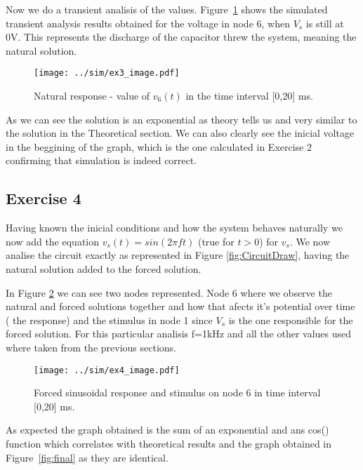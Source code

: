 Now we do a transient analisis of the values. Figure~\ref{fig:Ex3_Image} shows the simulated transient analysis results obtained for the voltage in node 6, when $V_s$ is still at 0V. This represents the discharge of the capacitor threw the system, meaning the natural solution.
\vspace{-32mm}

\begin{figure}[H]
  \centering
  \small
  \texttt{[image: ../sim/ex3\_image.pdf]}
  \caption{Natural response - value of $v_6(t)$ in the time interval [0,20] ms.}
  \label{fig:Ex3_Image}
\end{figure}

As we can see the solution is an exponential as theory tells us and very similar to the solution in the Theoretical section. We can also clearly see the inicial voltage in the beggining of the graph, which is the one calculated in Exercise 2 confirming that simulation is indeed correct.


\subsection{Exercise 4} \label{sec:Ex4Sim}
Having known the inicial conditions and how the system behaves naturally we now add the equation $v_s(t)=sin(2 \pi f t)$ (true for $t>0$) for $v_s$. We now analise the circuit exactly as represented in Figure \ref{fig:CircuitDraw}, having the natural solution added to the forced solution.\par
In Figure \ref{fig:Ex4_Image} we can see two nodes represented. Node 6 where we observe the natural and forced solutions together and how that afects it's potential over time ( the response) and the stimulus in node 1 since $V_s$ is the one responsible for the forced solution. For this particular analisis f=1kHz and all the other values used where taken from the previous sections. 

\vspace{-30mm}
\begin{figure}[H]
  \centering
  \texttt{[image: ../sim/ex4\_image.pdf]}
  \caption{Forced sinusoidal response and stimulus on node 6 in time interval [0,20] ms.}
  \label{fig:Ex4_Image}
\end{figure}


As expected the graph obtained is the sum of an exponential and ans cos() function which correlates with theoretical results and the graph obtained in Figure~\ref{fig:final} as they are identical.

